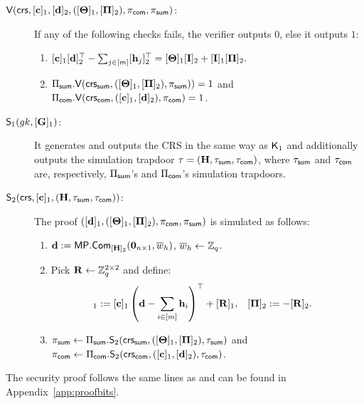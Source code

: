 \begin{description}
\item[{$\mathsf{V}(
    \mathsf{crs},
    [\mathbf{c}]_1,
    [\mathbf{d}]_2,
        ([\mathbf{{\Theta}}]_1, [\mathbf{{\Pi}}]_2), 
        \pi_{\mathsf{com}},\pi_{\mathsf{sum}} )$}:] If any of the following checks fails, the verifier outputs $0$, else it outputs $1$:
%   
\begin{enumerate}
\item 
$[\mathbf{c}]_1 [\mathbf{d}]_2^\top-
    \sum_{j \in [m]} [\mathbf{h}_j]_2^\top =
    [\mathbf{{\Theta}}]_1 [\mathbf{{I}}]_2 +  [\mathbf{{I}}]_1 [\mathbf{{\Pi}}]_2.$
  \item $\Pi_{\mathsf{sum}}.\mathsf{V}(\mathsf{crs}_{\mathsf{sum}},([\mathbf{{\Theta}}]_1,[\mathbf{{\Pi}}]_2),\pi_{\mathsf{sum}}))=1$ and $\Pi_{\mathsf{com}}.\mathsf{V}(\mathsf{crs}_{\mathsf{com}},([\mathbf{c}]_1,[\mathbf{d}]_2),\pi_{\mathsf{com}})=1$.
\end{enumerate}

%
\item[{$\mathsf{S}_1({gk},[\mathbf{{G}}]_1)$}:] It generates and outputs the CRS in the same way as $\mathsf{K}_1$ and additionally outputs the simulation trapdoor 
$\tau=\left(\mathbf{{H}},\tau_{\mathsf{sum}}, \tau_{\mathsf{com}}\right)$,
where $\tau_{\mathsf{sum}}$ and $\tau_{\mathsf{com}}$ are, respectively, $\Pi_{\mathsf{sum}}$'s and $\Pi_{\mathsf{com}}$'s simulation trapdoors.
\item[{$\mathsf{S}_2(\mathsf{crs},[\mathbf{c}]_1,\left(\mathbf{{H}},\tau_{\mathsf{sum}}, \tau_{\mathsf{com}}\right))$}:] The proof $([\mathbf{d}]_1,([\mathbf{{\Theta}}]_1,[\mathbf{{\Pi}}]_2),\pi_{\mathsf{com}},\pi_{\mathsf{sum}})$ is simulated as follows:
\begin{enumerate}
\item $\mathbf{d}:= \mathsf{MP}.\mathsf{Com}_{[\mathbf{{H}}]_2}(\mathbf{0}_{n\times1},\overline{w}_h)$, $\overline{w}_h \gets \mathbb{Z}_q$.
\item Pick $\mathbf{{R}} \gets \mathbb{Z}_q^{2 \times 2}$ and define:
\begin{align*} 
[\matr{\Theta}]_1 & :=  [\vecb{c}]_1\left(\vecb{d}-\sum_{i \in [m]} \lrck_i\right)^\top + [\matr{R}]_1,
    &
[\matr{\Pi}]_2 & := - [\matr{R}]_2.
\end{align*}
\item $\pi_{\mathsf{sum}}\gets\Pi_{\mathsf{sum}}.\mathsf{S}_2(\mathsf{crs}_{\mathsf{sum}},([\mathbf{{\Theta}}]_1,[\mathbf{{\Pi}}]_2),\tau_{\mathsf{sum}})$ and $\pi_{\mathsf{com}}\gets\Pi_{\mathsf{com}}.\mathsf{S}_2(\mathsf{crs}_{\mathsf{com}},([\mathbf{c}]_1,[\mathbf{d}]_2),\tau_{\mathsf{com}})$.
\end{enumerate}
\end{description}

The security proof follows the same lines as \cite{AC:GonHevRaf15} and can be found in Appendix~\ref{app:proofbits}.


